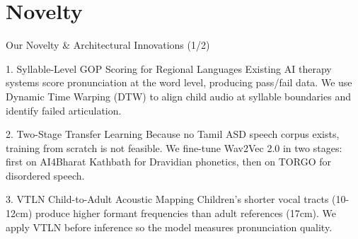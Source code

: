 \documentclass[aspectratio=169, 11pt, xcolor=table]{beamer}
\begin{document}
\section{Novelty}
\begin{frame}{Our Novelty \& Architectural Innovations (1/2)}
    \vspace{-2mm}
    \begin{block}{\small 1. Syllable-Level GOP Scoring for Regional Languages}
        \footnotesize
        Existing AI therapy systems score pronunciation at the word level, producing pass/fail data. We use Dynamic Time Warping (DTW) to align child audio at syllable boundaries and identify failed articulation.
    \end{block}
    \vspace{2mm}
    
    \begin{block}{\small 2. Two-Stage Transfer Learning}
        \footnotesize
        Because no Tamil ASD speech corpus exists, training from scratch is not feasible. We fine-tune Wav2Vec 2.0 in two stages: first on AI4Bharat Kathbath for Dravidian phonetics, then on TORGO for disordered speech.
    \end{block}
    \vspace{2mm}

    \begin{block}{\small 3. VTLN Child-to-Adult Acoustic Mapping}
        \footnotesize
        Children's shorter vocal tracts (10-12cm) produce higher formant frequencies than adult references (17cm). We apply VTLN before inference so the model measures pronunciation quality.
    \end{block}
\end{frame}
\end{document}
